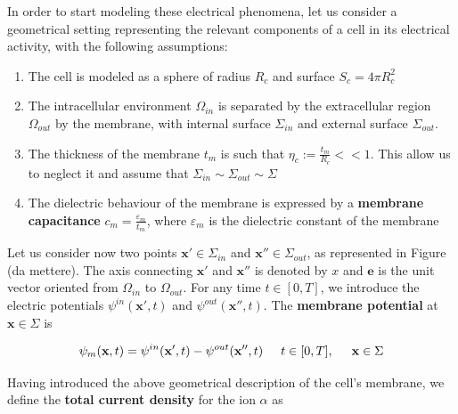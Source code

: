 \documentclass[12pt, a4paper]{report}
\begin{document}
In order to start modeling these electrical phenomena, let us consider a geometrical setting representing the relevant components of a cell in its electrical activity, with the following assumptions:

\begin{enumerate}
	
	\item The cell is modeled as a sphere of radius $R_c$ and surface $ S_c = 4\pi R_c^2$
	
	\item The intracellular environment $\Omega_{in}$ is separated by the extracellular region $\Omega_{out}$ by the membrane, with internal surface $\Sigma_{in}$ and external surface $\Sigma_{out}$.%
	
	\item The thickness of the membrane $t_m$ is such that $ \eta_c := \frac{t_m}{R_c} << 1$. This allow us to neglect it and assume that $\Sigma_{in} \sim \Sigma_{out} \sim \Sigma$ \label{ass 3}
	
	\item The dielectric behaviour of the membrane is expressed by a \textbf{membrane capacitance}  $ c_m = \frac{\varepsilon_m}{t_m} $, where $\varepsilon_m$ is the dielectric constant of the membrane \label{ass 4}
	
\end{enumerate}

Let us consider now two points $ \textbf{x}' \in \Sigma_{in}$ and $ \textbf{x}'' \in \Sigma_{out}$, as represented in Figure (da mettere). The axis connecting $ \textbf{x}'$ and $ \textbf{x}''$ is denoted by $x$ and $\textbf{e}$ is the unit vector oriented from $\Omega_{in}$ to $\Omega_{out}$. For any time $ t \in [0,T]$, we introduce the electric potentials $ \psi^{in} (\textbf{x}',t) $ and  $ \psi^{out} (\textbf{x}'',t) $. The \textbf{membrane potential} at $ \textbf{x} \in \Sigma$ is 

\begin{equation}
\psi_m (\textbf{x},t) = \psi^{in} (\textbf{x}',t) -  \psi^{out} (\textbf{x}'',t) \hspace{0.5 cm}  t \in [0,T], \hspace{0.5 cm} \textbf{x} \in \Sigma
\end{equation}



Having introduced the above geometrical description of the cell's membrane, we define the \textbf{total current density} for the  ion $\alpha$ as
\end{document}
